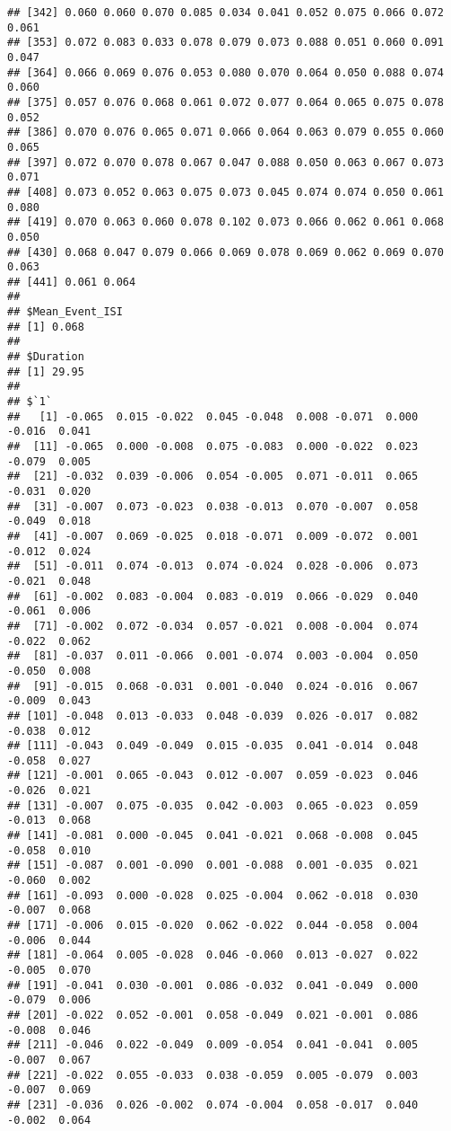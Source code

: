 \documentclass[]{article}
\begin{document}
\begin{verbatim}
## [342] 0.060 0.060 0.070 0.085 0.034 0.041 0.052 0.075 0.066 0.072 0.061
## [353] 0.072 0.083 0.033 0.078 0.079 0.073 0.088 0.051 0.060 0.091 0.047
## [364] 0.066 0.069 0.076 0.053 0.080 0.070 0.064 0.050 0.088 0.074 0.060
## [375] 0.057 0.076 0.068 0.061 0.072 0.077 0.064 0.065 0.075 0.078 0.052
## [386] 0.070 0.076 0.065 0.071 0.066 0.064 0.063 0.079 0.055 0.060 0.065
## [397] 0.072 0.070 0.078 0.067 0.047 0.088 0.050 0.063 0.067 0.073 0.071
## [408] 0.073 0.052 0.063 0.075 0.073 0.045 0.074 0.074 0.050 0.061 0.080
## [419] 0.070 0.063 0.060 0.078 0.102 0.073 0.066 0.062 0.061 0.068 0.050
## [430] 0.068 0.047 0.079 0.066 0.069 0.078 0.069 0.062 0.069 0.070 0.063
## [441] 0.061 0.064
## 
## $Mean_Event_ISI
## [1] 0.068
## 
## $Duration
## [1] 29.95
## 
## $`1`
##   [1] -0.065  0.015 -0.022  0.045 -0.048  0.008 -0.071  0.000 -0.016  0.041
##  [11] -0.065  0.000 -0.008  0.075 -0.083  0.000 -0.022  0.023 -0.079  0.005
##  [21] -0.032  0.039 -0.006  0.054 -0.005  0.071 -0.011  0.065 -0.031  0.020
##  [31] -0.007  0.073 -0.023  0.038 -0.013  0.070 -0.007  0.058 -0.049  0.018
##  [41] -0.007  0.069 -0.025  0.018 -0.071  0.009 -0.072  0.001 -0.012  0.024
##  [51] -0.011  0.074 -0.013  0.074 -0.024  0.028 -0.006  0.073 -0.021  0.048
##  [61] -0.002  0.083 -0.004  0.083 -0.019  0.066 -0.029  0.040 -0.061  0.006
##  [71] -0.002  0.072 -0.034  0.057 -0.021  0.008 -0.004  0.074 -0.022  0.062
##  [81] -0.037  0.011 -0.066  0.001 -0.074  0.003 -0.004  0.050 -0.050  0.008
##  [91] -0.015  0.068 -0.031  0.001 -0.040  0.024 -0.016  0.067 -0.009  0.043
## [101] -0.048  0.013 -0.033  0.048 -0.039  0.026 -0.017  0.082 -0.038  0.012
## [111] -0.043  0.049 -0.049  0.015 -0.035  0.041 -0.014  0.048 -0.058  0.027
## [121] -0.001  0.065 -0.043  0.012 -0.007  0.059 -0.023  0.046 -0.026  0.021
## [131] -0.007  0.075 -0.035  0.042 -0.003  0.065 -0.023  0.059 -0.013  0.068
## [141] -0.081  0.000 -0.045  0.041 -0.021  0.068 -0.008  0.045 -0.058  0.010
## [151] -0.087  0.001 -0.090  0.001 -0.088  0.001 -0.035  0.021 -0.060  0.002
## [161] -0.093  0.000 -0.028  0.025 -0.004  0.062 -0.018  0.030 -0.007  0.068
## [171] -0.006  0.015 -0.020  0.062 -0.022  0.044 -0.058  0.004 -0.006  0.044
## [181] -0.064  0.005 -0.028  0.046 -0.060  0.013 -0.027  0.022 -0.005  0.070
## [191] -0.041  0.030 -0.001  0.086 -0.032  0.041 -0.049  0.000 -0.079  0.006
## [201] -0.022  0.052 -0.001  0.058 -0.049  0.021 -0.001  0.086 -0.008  0.046
## [211] -0.046  0.022 -0.049  0.009 -0.054  0.041 -0.041  0.005 -0.007  0.067
## [221] -0.022  0.055 -0.033  0.038 -0.059  0.005 -0.079  0.003 -0.007  0.069
## [231] -0.036  0.026 -0.002  0.074 -0.004  0.058 -0.017  0.040 -0.002  0.064

\end{verbatim}
\end{document}

